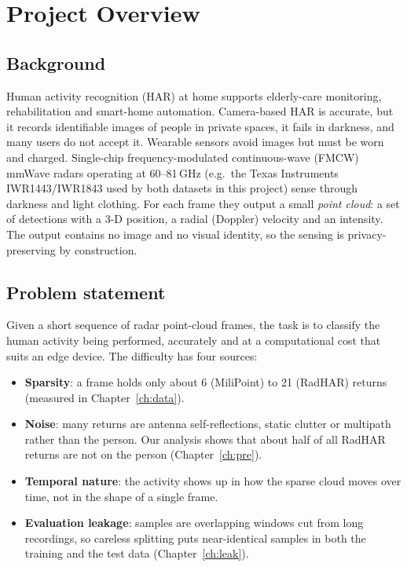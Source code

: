 \chapter{Project Overview}

\section{Background}
Human activity recognition (HAR) at home supports elderly-care monitoring,
rehabilitation and smart-home automation. Camera-based HAR is accurate, but it
records identifiable images of people in private spaces, it fails in darkness,
and many users do not accept it. Wearable sensors avoid images but must be worn
and charged. Single-chip frequency-modulated continuous-wave (FMCW) mmWave radars
operating at 60--81\,GHz (e.g.\ the Texas Instruments IWR1443/IWR1843 used by
both datasets in this project) sense through darkness and light clothing. For
each frame they output a small \emph{point cloud}: a set of detections with a 3-D
position, a radial (Doppler) velocity and an intensity. The output contains no
image and no visual identity, so the sensing is privacy-preserving by
construction.

\section{Problem statement}
Given a short sequence of radar point-cloud frames, the task is to classify the
human activity being performed, accurately and at a computational cost that
suits an edge device. The difficulty has four sources:
\begin{itemize}[nosep]
\item \textbf{Sparsity}: a frame holds only about 6 (MiliPoint) to 21 (RadHAR) returns
  (measured in Chapter~\ref{ch:data}).
\item \textbf{Noise}: many returns are antenna self-reflections, static clutter
  or multipath rather than the person. Our analysis shows that about half of all
  RadHAR returns are not on the person (Chapter~\ref{ch:pre}).
\item \textbf{Temporal nature}: the activity shows up in how the sparse cloud moves
  over time, not in the shape of a single frame.
\item \textbf{Evaluation leakage}: samples are overlapping windows cut from long
  recordings, so careless splitting puts near-identical samples in both the
  training and the test data (Chapter~\ref{ch:leak}).
\end{itemize}

